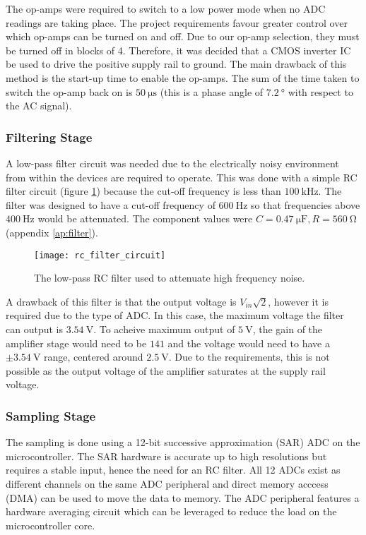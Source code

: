 The op-amps were required to switch to a low power mode when no ADC readings are taking place.
The project requirements favour greater control over which op-amps can be turned on and off.
Due to our op-amp selection, they must be turned off in blocks of 4.
Therefore, it was decided that a CMOS inverter IC be used to drive the positive supply rail to ground.
The main drawback of this method is the start-up time to enable the op-amps.
The sum of the time taken to switch the op-amp back on is $\SI{50}{\micro\second}$ (this is a phase angle of $\SI{7.2}{\degree}$ with respect to the AC signal).

\subsubsection{Filtering Stage}

A low-pass filter circuit was needed due to the electrically noisy environment from within the devices are required to operate.
This was done with a simple RC filter circuit (figure \ref{fig:filter}) because the cut-off frequency is less than $\SI{100}{\kilo\hertz}$.
The filter was designed to have a cut-off frequency of $\SI{600}{\hertz}$ so that frequencies above $\SI{400}{\hertz}$ would be attenuated.
The component values were $C = \SI{0.47}{\micro\farad}, R = \SI{560}{\ohm}$ (appendix \ref{ap:filter}).
\begin{figure}[H]
	\centering
	\texttt{[image: rc\_filter\_circuit]}
	\caption{The low-pass RC filter used to attenuate high frequency noise.}
	\label{fig:filter}
\end{figure}

A drawback of this filter is that the output voltage is $V_{in} \sqrt{2}$, however it is required due to the type of ADC.
In this case, the maximum voltage the filter can output is $\SI{3.54}{\volt}$.
To acheive maximum output of $\SI{5}{\volt}$, the gain of the amplifier stage would need to be $141$ and the voltage would need to have a $\pm\SI{3.54}{\volt}$ range, centered around $\SI{2.5}{\volt}$.
Due to the requirements, this is not possible as the output voltage of the amplifier saturates at the supply rail voltage.

\subsubsection{Sampling Stage}

The sampling is done using a 12-bit successive approximation (SAR) ADC on the microcontroller.
The SAR hardware is accurate up to high resolutions but requires a stable input, hence the need for an RC filter.
All 12 ADCs exist as different channels on the same ADC peripheral and direct memory acccess (DMA) can be used to move the data to memory.
The ADC peripheral features a hardware averaging circuit which can be leveraged to reduce the load on the microcontroller core.


